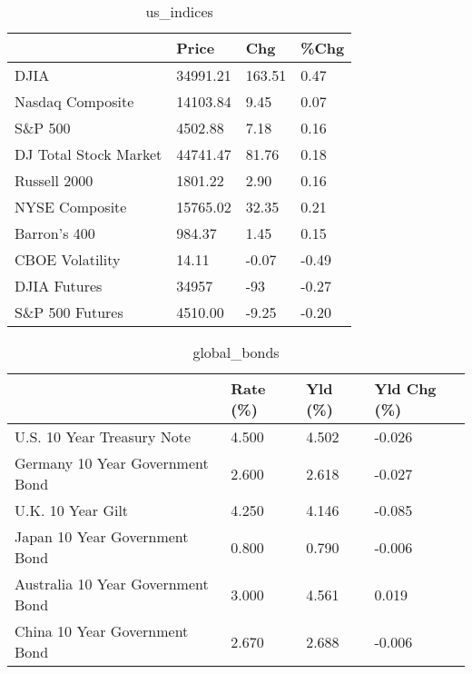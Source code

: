 \documentclass{article}%
\begin{document}
%


\begin{table}[htbp]%
\caption{us\_indices}%
\centering%
\begin{adjustbox}{width=1\textwidth}%
\begin{tabular}{llll}
\toprule
                      &    Price &    Chg &  \%Chg \\
\midrule
                 DJIA & 34991.21 & 163.51 &  0.47 \\
     Nasdaq Composite & 14103.84 &   9.45 &  0.07 \\
              S\&P 500 &  4502.88 &   7.18 &  0.16 \\
DJ Total Stock Market & 44741.47 &  81.76 &  0.18 \\
         Russell 2000 &  1801.22 &   2.90 &  0.16 \\
       NYSE Composite & 15765.02 &  32.35 &  0.21 \\
         Barron's 400 &   984.37 &   1.45 &  0.15 \\
      CBOE Volatility &    14.11 &  -0.07 & -0.49 \\
         DJIA Futures &    34957 &    -93 & -0.27 \\
      S\&P 500 Futures &  4510.00 &  -9.25 & -0.20 \\
\bottomrule
\end{tabular}
%
\end{adjustbox}%
\end{table}

%


\begin{table}[htbp]%
\caption{global\_bonds}%
\centering%
\begin{adjustbox}{width=1\textwidth}%
\begin{tabular}{llll}
\toprule
                                  & Rate (\%) & Yld (\%) & Yld Chg (\%) \\
\midrule
       U.S. 10 Year Treasury Note &    4.500 &   4.502 &      -0.026 \\
  Germany 10 Year Government Bond &    2.600 &   2.618 &      -0.027 \\
                U.K. 10 Year Gilt &    4.250 &   4.146 &      -0.085 \\
    Japan 10 Year Government Bond &    0.800 &   0.790 &      -0.006 \\
Australia 10 Year Government Bond &    3.000 &   4.561 &       0.019 \\
    China 10 Year Government Bond &    2.670 &   2.688 &      -0.006 \\
\bottomrule
\end{tabular}
%
\end{adjustbox}%
\end{table}
\end{document}
